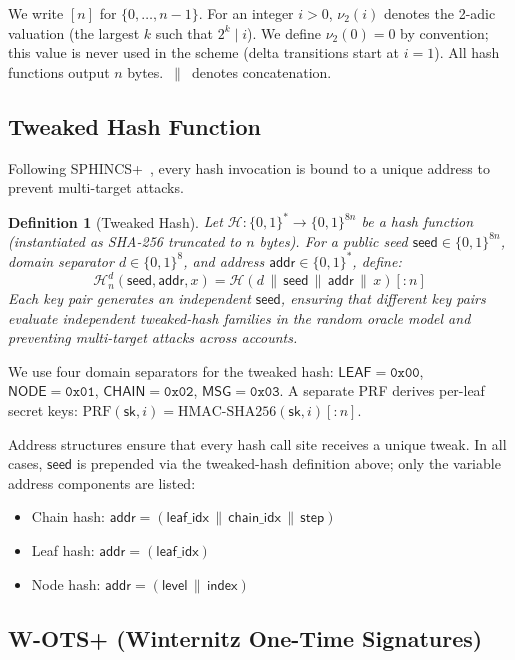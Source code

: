 \documentclass[11pt]{article}
\newtheorem{definition}[theorem]{Definition}
\newcommand{\hash}{\mathcal{H}}
\newcommand{\prf}{\mathrm{PRF}}
\newcommand{\bin}{\{0,1\}}
\newcommand{\concat}{\,\|\,}
\begin{document}
We write $[n]$ for $\{0, \ldots, n-1\}$. For an integer $i > 0$,
$\nu_2(i)$ denotes the 2-adic valuation (the largest $k$ such that
$2^k \mid i$). We define $\nu_2(0) = 0$ by convention; this value is
never used in the scheme (delta transitions start at $i = 1$). All hash functions output $n$
bytes. $\concat$ denotes concatenation.

\subsection{Tweaked Hash Function}

Following SPHINCS+~\cite{sphincs}, every hash invocation is bound to a
unique address to prevent multi-target attacks.

\begin{definition}[Tweaked Hash]
Let $\hash : \bin^* \to \bin^{8n}$ be a hash function (instantiated as
SHA-256 truncated to $n$ bytes). For a public seed
$\mathsf{seed} \in \bin^{8n}$, domain separator $d \in \bin^8$, and
address $\mathsf{addr} \in \bin^*$, define:
\[
\hash_n^d(\mathsf{seed}, \mathsf{addr}, x) = \hash(d \concat
\mathsf{seed} \concat \mathsf{addr} \concat x)[{:}n]
\]
Each key pair generates an independent $\mathsf{seed}$, ensuring that
different key pairs evaluate independent tweaked-hash families in the
random oracle model and preventing multi-target attacks across accounts.
\end{definition}

We use four domain separators for the tweaked hash:
$\mathsf{LEAF} = \mathtt{0x00}$,
$\mathsf{NODE} = \mathtt{0x01}$, $\mathsf{CHAIN} = \mathtt{0x02}$,
$\mathsf{MSG} = \mathtt{0x03}$.
A separate PRF derives per-leaf secret keys:
$\prf(\mathsf{sk}, i) = \mathrm{HMAC}\text{-}\mathrm{SHA256}(\mathsf{sk}, i)[{:}n]$.

Address structures ensure that every hash call site receives a unique
tweak. In all cases, $\mathsf{seed}$ is prepended via the tweaked-hash
definition above; only the variable address components are listed:
\begin{itemize}
\item Chain hash: $\mathsf{addr} = (\mathsf{leaf\_idx} \concat
\mathsf{chain\_idx} \concat \mathsf{step})$
\item Leaf hash: $\mathsf{addr} = (\mathsf{leaf\_idx})$
\item Node hash: $\mathsf{addr} = (\mathsf{level} \concat
\mathsf{index})$
\end{itemize}

\subsection{W-OTS+ (Winternitz One-Time Signatures)}
\end{document}
